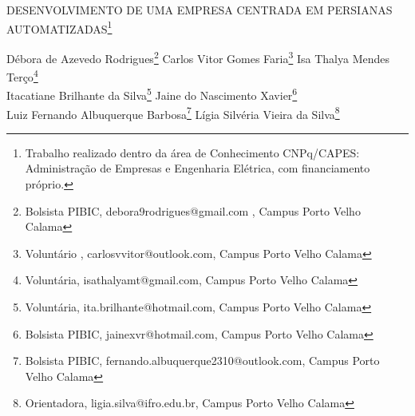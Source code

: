 \documentclass[article,12pt,onesidea,4paper,english,brazil]{abntex2}
\begin{document}
	
	
	\frenchspacing 
	
	\begin{center}
		\LARGE DESENVOLVIMENTO DE UMA EMPRESA CENTRADA EM PERSIANAS AUTOMATIZADAS\footnote{Trabalho realizado dentro da área de Conhecimento CNPq/CAPES: Administração de Empresas e Engenharia Elétrica, com financiamento próprio.}
		
		\normalsize
		Débora de Azevedo Rodrigues\footnote{Bolsista PIBIC, debora9rodrigues@gmail.com , Campus Porto Velho Calama} 
		Carlos Vitor Gomes Faria\footnote{Voluntário , carlosvvitor@outlook.com, Campus Porto Velho Calama} 
		Isa Thalya Mendes Terço\footnote{Voluntária, isathalyamt@gmail.com, Campus Porto Velho Calama} \\
		Itacatiane Brilhante da Silva\footnote{Voluntária, ita.brilhante@hotmail.com, Campus Porto Velho Calama}
		Jaine do Nascimento Xavier\footnote{Bolsista PIBIC, jainexvr@hotmail.com, Campus Porto Velho Calama}\\
		Luiz Fernando Albuquerque Barbosa\footnote{Bolsista PIBIC, fernando.albuquerque2310@outlook.com, Campus Porto Velho Calama}
		Lígia Silvéria Vieira da Silva\footnote{Orientadora, ligia.silva@ifro.edu.br, Campus Porto Velho Calama}
	\end{center}
	
\end{document}

